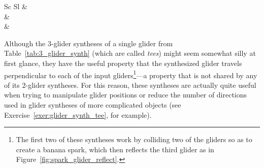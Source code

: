 \begin{table}[!htbp]
\begin{center}
\begin{tabular}{Sc Sl}
			  &  \\
			
			 &  \\
			
			  &  \\\bottomrule
		\end{tabular}
		\caption{A selection of useful $3$-glider syntheses. The $3$-glider collision that creates a glider-producing switch engine is not a true glider synthesis due to the fact that it also creates a wide assortment of other debris, but it is nonetheless noteworthy for being the only known way of generating infinite growth with just $3$ gliders.}\label{tab:3_glider_synth}
	\end{center}
\end{table}

Although the $3$-glider syntheses of a single glider from Table~\ref{tab:3_glider_synth} (which are called \emph{tees}) might seem somewhat silly at first glance, they have the useful property that the synthesized glider travels perpendicular to each of the input gliders\footnote{The first two of these syntheses work by colliding two of the gliders so as to create a banana spark, which then reflects the third glider as in Figure~\ref{fig:spark_glider_reflect}.}---a property that is not shared by any of its $2$-glider syntheses. For this reason, these syntheses are actually quite useful when trying to manipulate glider positions or reduce the number of directions used in glider syntheses of more complicated objects (see Exercise~\ref{exer:glider_synth_tee}, for example).

